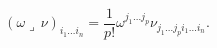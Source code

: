 \begin{equation}
   (\omega \lrcorner\,\nu)_{i_1\dots i_n}
       = \frac{1}{p!}\omega^{j_1\dots j_p}
          \nu_{j_1\dots j_pi_1\dots i_n} .
\end{equation}

